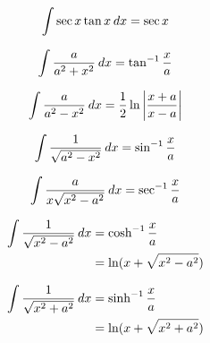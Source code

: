 \begin{center}
\begin{multicols}{2}
		\begin{equation}
			\int \sec x \tan x \hspace{2pt}dx = \sec x
		\end{equation}
		
		\begin{equation}
			\int \frac{a}{a^2+x^2}\hspace{2pt}dx = \tan^{-1}\frac{x}{a}
		\end{equation}
		
		\begin{equation}
			\int \frac{a}{a^2-x^2}\hspace{2pt}dx = \frac{1}{2}\ln\left|\frac{x+a}{x-a}\right|
		\end{equation}
		
		\begin{equation}
			\int \frac{1}{\sqrt{a^2-x^2}} \hspace{2pt}dx = \sin^{-1} \frac{x}{a}
		\end{equation}
		
		\begin{equation}
			\int \frac{a}{x \sqrt{x^2-a^2}} \hspace{2pt}dx = \sec^{-1} \frac{x}{a}
		\end{equation}
		
		\begin{align}
			\int \frac{1}{\sqrt{x^2-a^2}} \hspace{2pt}dx &= \cosh^{-1} \frac{x}{a} \\&= \nonumber \ln (x+\sqrt{x^2-a^2})
		\end{align}
		
		\begin{align}
			\int \frac{1}{\sqrt{x^2+a^2}} \hspace{2pt}dx &= \sinh^{-1} \frac{x}{a} \\&=\nonumber \ln (x+\sqrt{x^2+a^2})
		\end{align}
		
	\end{multicols}
\end{center}		

